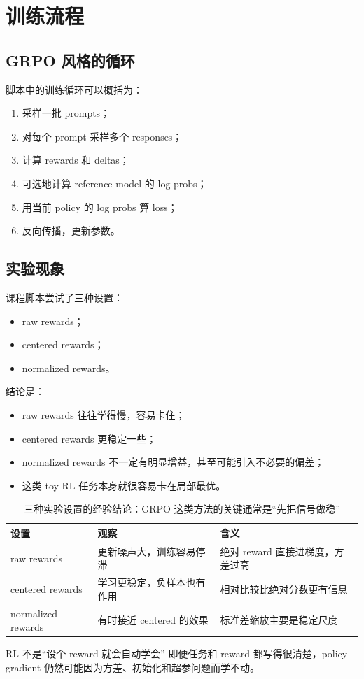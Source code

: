 \section{训练流程}

\subsection{GRPO 风格的循环}

脚本中的训练循环可以概括为：
\begin{enumerate}
    \item 采样一批 prompts；
    \item 对每个 prompt 采样多个 responses；
    \item 计算 rewards 和 deltas；
    \item 可选地计算 reference model 的 log probs；
\item 用当前 policy 的 log probs 算 loss；
\item 反向传播，更新参数。
\end{enumerate}


\subsection{实验现象}

课程脚本尝试了三种设置：
\begin{itemize}
    \item raw rewards；
    \item centered rewards；
    \item normalized rewards。
\end{itemize}

结论是：
\begin{itemize}
    \item raw rewards 往往学得慢，容易卡住；
    \item centered rewards 更稳定一些；
    \item normalized rewards 不一定有明显增益，甚至可能引入不必要的偏差；
    \item 这类 toy RL 任务本身就很容易卡在局部最优。
\end{itemize}

\begin{table}[H]
\centering
\begin{tabular}{@{}p{3.2cm}p{4.6cm}p{4.8cm}@{}}
\toprule
\textbf{设置} & \textbf{观察} & \textbf{含义} \\
\midrule
raw rewards & 更新噪声大，训练容易停滞 & 绝对 reward 直接进梯度，方差过高 \\
centered rewards & 学习更稳定，负样本也有作用 & 相对比较比绝对分数更有信息 \\
normalized rewards & 有时接近 centered 的效果 & 标准差缩放主要是稳定尺度 \\
\bottomrule
\end{tabular}
\caption{三种实验设置的经验结论：GRPO 这类方法的关键通常是“先把信号做稳”}
\end{table}


\begin{warningbox}{RL 不是“设个 reward 就会自动学会”}
即便任务和 reward 都写得很清楚，policy gradient 仍然可能因为方差、初始化和超参问题而学不动。
\end{warningbox}

